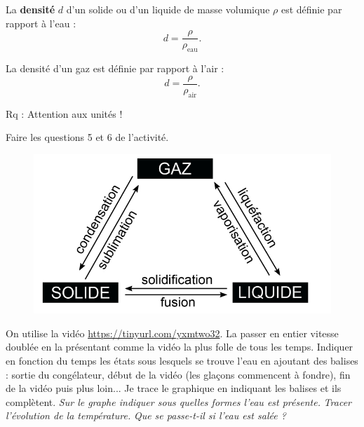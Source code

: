 \begin{definition}
La \textbf{densité} $d$ d'un solide ou d'un liquide de masse volumique $\rho$ est définie par rapport à l'eau :
\begin{equation}
d = \frac{\rho}{\rho_\mathrm{eau}}.
\nonumber
\end{equation}

La densité d'un gaz est définie par rapport à l'air :
\begin{equation}
d = \frac{\rho}{\rho_\mathrm{air}}.
\nonumber
\end{equation}
\end{definition}
Rq : Attention aux unités !

\begin{prior}
Faire les questions 5 et 6 de l'activité.
\end{prior}

\begin{figure}[h]
\center
\includegraphics[scale=1]{images/changements_d_etat.jpg}
\end{figure}

\begin{prior}
On utilise la vidéo \href{https://tinyurl.com/yxmtwo32}{https://tinyurl.com/yxmtwo32}.
La passer en entier vitesse doublée en la présentant comme la vidéo la plus folle de tous les temps.
Indiquer en fonction du temps les états sous lesquels se trouve l'eau en ajoutant des balises : sortie du congélateur, début de la vidéo (les glaçons commencent à fondre), fin de la vidéo puis plus loin...
Je trace le graphique en indiquant les balises et ils complètent.
\emph{Sur le graphe indiquer sous quelle\cdot s forme\cdot s l'eau est présente.}
\emph{Tracer l'évolution de la température.}
\emph{Que se passe-t-il si l'eau est salée ?}
\end{prior}

